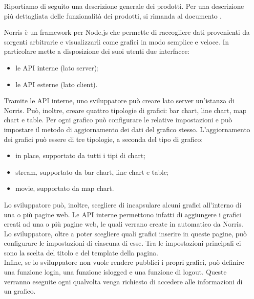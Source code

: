     Riportiamo di seguito una descrizione generale dei prodotti. Per una descrizione più dettagliata delle funzionalità dei prodotti, si rimanda al documento .

    Norris è un framework per Node.js che permette di raccogliere dati provenienti da sorgenti arbitrarie e visualizzarli come grafici in modo semplice e veloce. In particolare mette a disposizione dei suoi utenti due interfacce:
    \begin{itemize}
        \item le API interne (lato server);
        \item le API esterne (lato client).
    \end{itemize}
    
    Tramite le API interne, uno sviluppatore può creare lato server un'istanza di Norris. Può, inoltre, creare quattro tipologie di grafici: bar chart, line chart, map chart e table. Per ogni grafico può configurare le relative impostazioni e può impostare il metodo di aggiornamento dei dati del grafico stesso. L'aggiornamento dei grafici può essere di tre tipologie, a seconda del tipo di grafico:
    \begin{itemize}
        \item in place, supportato da tutti i tipi di chart;
        \item stream, supportato da bar chart, line chart e table;
        \item movie, supportato da map chart.
    \end{itemize}
    
    
    
    Lo sviluppatore può, inoltre, scegliere di incapsulare alcuni grafici all'interno di una o più pagine web. Le API interne permettono infatti di aggiungere i grafici creati ad una o più pagine web, le quali verrano create in automatico da Norris. Lo sviluppatore, oltre a poter scegliere quali grafici inserire in queste pagine, può configurare le impostazioni di ciascuna di esse. Tra le impostazioni principali ci sono la scelta del titolo e del template della pagina.\\
    Infine, se lo sviluppatore non vuole rendere pubblici i propri grafici, può definire una funzione login, una funzione islogged e una funzione di logout. Queste verranno eseguite ogni qualvolta venga richiesto di accedere alle informazioni di un grafico.
   
